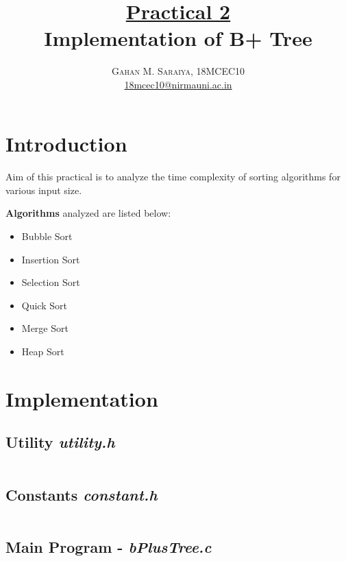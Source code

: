 \documentclass[paper=letter, fontsize=12pt]{article}
\title{\vspace{-15mm}\fontsize{24pt}{10pt}\selectfont\textbf{
		\underline{Practical 2}\\Implementation of B+ Tree}} %
\author{\large{\textsc{
		Gahan M. Saraiya, 18MCEC10 }}\\[2mm]
\normalsize \href{mailto:18mcec10@nirmauni.ac.in}{18mcec10@nirmauni.ac.in}\\[2mm] %
}
\date{}
\begin{document}
\maketitle %
\thispagestyle{fancy} %

\newcommand*\tick{\item[\Checkmark]}
\newcommand*\arrow{\item[$\Rightarrow$]}
\newcommand*\fail{\item[\XSolidBrush]}

\section{Introduction}
\paragraph{}
Aim of this practical is to analyze the time complexity of sorting algorithms for various input size.

\textbf{Algorithms} analyzed are listed below:
\begin{itemize}
	\item Bubble Sort
	\item Insertion Sort
	\item Selection Sort
	\item Quick Sort
	\item Merge Sort
	\item Heap Sort
\end{itemize}

\section{Implementation}

\subsection{Utility \textbf{\textit{utility.h}}}
\inputminted[frame=lines, breaklines, linenos]{c}{../../utils/utility.h}

\subsection{Constants \textbf{\textit{constant.h}}}
\inputminted[frame=lines, breaklines, linenos]{c}{../../utils/constant.h}

\subsection{Main Program - \textbf{\textit{bPlusTree.c}}}
\inputminted[frame=lines, breaklines, linenos]{c}{../bPlusTree.c}
\end{document}
